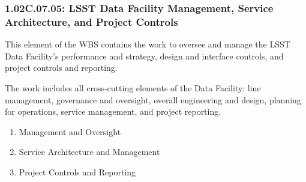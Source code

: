 \subsubsection*{1.02C.07.05: LSST Data Facility Management, Service Architecture, and Project Controls}

This element of the WBS contains the work to oversee and manage the LSST Data Facility's performance and strategy, design and interface controls, and project controls and reporting.

The work includes all cross-cutting elements of the Data Facility: line management, governance and oversight, overall engineering and design, planning for operations, service management, and project reporting.

\begin{enumerate}

  \item{Management and Oversight}
  \item{Service Architecture and Management}
  \item{Project Controls and Reporting}

\end{enumerate}

